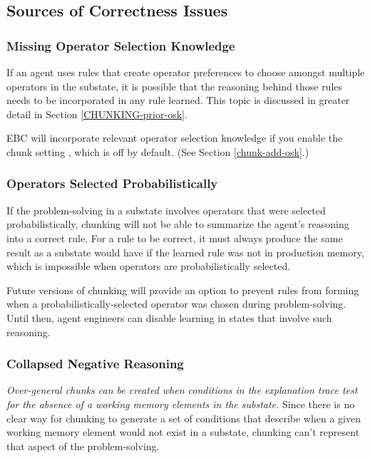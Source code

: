 \subsection{Sources of Correctness Issues}
\label{CHUNKING-correctness-issues}

\subsubsection{Missing Operator Selection Knowledge}

If an agent uses rules that create operator preferences to choose amongst multiple operators in the substate, it is possible that the reasoning behind those rules needs to be incorporated in any rule learned.  This topic is discussed in greater detail in Section \ref{CHUNKING-prior-osk}.  

EBC will incorporate relevant operator selection knowledge if you enable the chunk setting , which is off by default. (See Section \ref{chunk-add-osk}.)

\subsubsection{Operators Selected Probabilistically}

If the problem-solving in a substate involves operators that were selected probabilistically, chunking will not be able to summarize the agent's reasoning into a correct rule.  For a rule to be correct, it must always produce the same result as a substate would have if the learned rule was not in production memory, which is impossible when operators are probabilistically selected.

Future versions of chunking will provide an option to prevent rules from forming when a probabilistically-selected operator was chosen during problem-solving.  Until then, agent engineers can disable learning in states that involve such reasoning.

\subsubsection{Collapsed Negative Reasoning}

\emph{Over-general chunks can be created when conditions in the explanation trace test for the absence of a working memory elements in the substate.} Since there is no clear way for chunking to generate a set of conditions that describe when a given working memory element would not exist in a substate, chunking can't represent that aspect of the problem-solving. 

